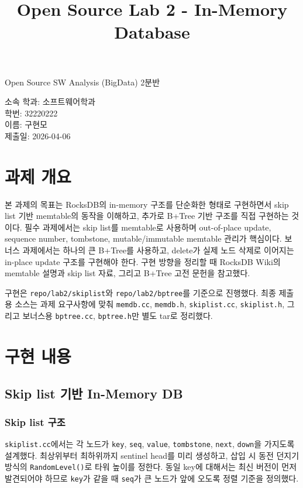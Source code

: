 \documentclass[11pt,a4paper]{article}
\makeatletter
\newcommand{\subtitle}[1]{\gdef\@subtitle{#1}}
\newcommand{\studentinfo}[1]{\gdef\@studentinfo{#1}}
\def\@subtitle{}
\def\@studentinfo{}
\renewcommand{\maketitle}{%
  \begin{center}
    {\LARGE\bfseries \@title\par}
    \vspace{0.5em}
    {\large \@subtitle\par}
  \end{center}
  \vspace{-1.0em}
  \begin{flushright}
    \normalsize \@studentinfo
  \end{flushright}
}
\makeatother
\begin{document}
\title{Open Source Lab 2 - In-Memory Database}
\subtitle{Open Source SW Analysis (BigData) 2분반}
\studentinfo{
소속 학과: 소프트웨어학과\\
학번: 32220222\\
이름: 구현모\\
제출일: 2026-04-06
}

\maketitle

\section{과제 개요}
본 과제의 목표는 RocksDB의 in-memory 구조를 단순화한 형태로 구현하면서 skip list 기반 memtable의 동작을 이해하고, 추가로 B+Tree 기반 구조를 직접 구현하는 것이다. 필수 과제에서는 skip list를 memtable로 사용하며 out-of-place update, sequence number, tombstone, mutable/immutable memtable 관리가 핵심이다. 보너스 과제에서는 하나의 큰 B+Tree를 사용하고, delete가 실제 노드 삭제로 이어지는 in-place update 구조를 구현해야 한다. 구현 방향을 정리할 때 RocksDB Wiki의 memtable 설명과 skip list 자료, 그리고 B+Tree 고전 문헌을 참고했다.

구현은 \texttt{repo/lab2/skiplist}와 \texttt{repo/lab2/bptree}를 기준으로 진행했다. 최종 제출용 소스는 과제 요구사항에 맞춰 \texttt{memdb.cc}, \texttt{memdb.h}, \texttt{skiplist.cc}, \texttt{skiplist.h}, 그리고 보너스용 \texttt{bptree.cc}, \texttt{bptree.h}만 별도 tar로 정리했다.

\section{구현 내용}
\subsection{Skip list 기반 In-Memory DB}
\subsubsection{Skip list 구조}
\texttt{skiplist.cc}에서는 각 노드가 \texttt{key}, \texttt{seq}, \texttt{value}, \texttt{tombstone}, \texttt{next}, \texttt{down}을 가지도록 설계했다. 최상위부터 최하위까지 sentinel head를 미리 생성하고, 삽입 시 동전 던지기 방식의 \texttt{RandomLevel()}로 타워 높이를 정한다. 동일 key에 대해서는 최신 버전이 먼저 발견되어야 하므로 \texttt{key}가 같을 때 \texttt{seq}가 큰 노드가 앞에 오도록 정렬 기준을 정의했다.
\end{document}
